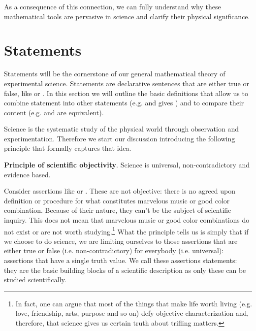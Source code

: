 \documentclass[11pt,letterpaper,fleqn]{memoir} %
\begin{document}
As a consequence of this connection, we can fully understand why these mathematical tools are pervasive in science and clarify their physical significance.

\section{Statements}

Statements will be the cornerstone of our general mathematical theory of experimental science. Statements are declarative sentences that are either true or false, like  or . In this section we will outline the basic definitions that allow us to combine statement into other statements (e.g.  and  gives ) and to compare their content (e.g.  and  are equivalent).

Science is the systematic study of the physical world through observation and experimentation. Therefore we start our discussion introducing the following principle that formally captures that idea.

\begin{mathSection}
	\textbf{Principle of scientific objectivity}.
		Science is universal, non-contradictory and evidence based.
\end{mathSection}

Consider assertions like  or . These are not objective: there is no agreed upon definition or procedure for what constitutes marvelous music or good color combination. Because of their nature, they can't be the subject of scientific inquiry. This does not mean that marvelous music or good color combinations do not exist or are not worth studying.\footnote{In fact, one can argue that most of the things that make life worth living (e.g. love, friendship, arts, purpose and so on) defy objective characterization and, therefore, that science gives us certain truth about trifling matters.} What the principle tells us is simply that if we choose to do science, we are limiting ourselves to those assertions that are either true or false (i.e. non-contradictory) for everybody (i.e. universal): assertions that have a single truth value. We call these assertions statements: they are the basic building blocks of a scientific description as only these can be studied scientifically.
\end{document}
